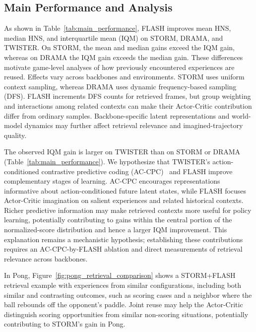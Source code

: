 \documentclass{article} %
\begin{document}
\subsection{Main Performance and Analysis}
\label{subsec:main_performance}

As shown in Table~\ref{tab:main_performance}, FLASH improves mean HNS, median HNS, and interquartile mean (IQM) on STORM, DRAMA, and TWISTER. On STORM, the mean and median gains exceed the IQM gain, whereas on DRAMA the IQM gain exceeds the median gain. These differences motivate game-level analyses of how previously encountered experiences are reused. Effects vary across backbones and environments. STORM uses uniform context sampling, whereas DRAMA uses dynamic frequency-based sampling (DFS). FLASH increments DFS counts for retrieved frames, but group weighting and interactions among related contexts can make their Actor-Critic contribution differ from ordinary samples. Backbone-specific latent representations and world-model dynamics may further affect retrieval relevance and imagined-trajectory quality.

The observed IQM gain is larger on TWISTER than on STORM or DRAMA (Table~\ref{tab:main_performance}). We hypothesize that TWISTER's action-conditioned contrastive predictive coding (AC-CPC)~\citep{burchi2025learning} and FLASH improve complementary stages of learning. AC-CPC encourages representations informative about action-conditioned future latent states, while FLASH focuses Actor-Critic imagination on salient experiences and related historical contexts. Richer predictive information may make retrieved contexts more useful for policy learning, potentially contributing to gains within the central portion of the normalized-score distribution and hence a larger IQM improvement. This explanation remains a mechanistic hypothesis; establishing these contributions requires an AC-CPC-by-FLASH ablation and direct measurements of retrieval relevance across backbones.

In Pong, Figure~\ref{fig:pong_retrieval_comparison} shows a STORM+FLASH retrieval example with experiences from similar configurations, including both similar and contrasting outcomes, such as scoring cases and a neighbor where the ball rebounds off the opponent's paddle. Joint reuse may help the Actor-Critic distinguish scoring opportunities from similar non-scoring situations, potentially contributing to STORM's gain in Pong.
\end{document}
